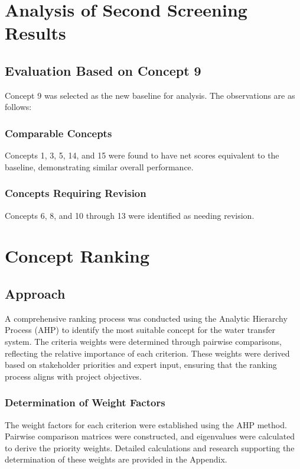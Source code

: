 \documentclass[12pt]{article}
\begin{document}
\section{Analysis of Second Screening Results}

\subsection{Evaluation Based on Concept 9}  

Concept 9 was selected as the new baseline for analysis. The observations are as follows: 

\subsubsection{Comparable Concepts}  
Concepts 1, 3, 5, 14, and 15 were found to have net scores equivalent to the baseline, demonstrating similar overall performance.  

\subsubsection{Concepts Requiring Revision}  
Concepts 6, 8, and 10 through 13 were identified as needing revision.

\section{Concept Ranking}

\subsection{Approach}

A comprehensive ranking process was conducted using the Analytic Hierarchy Process (AHP) to identify the most suitable concept for the water transfer system. The criteria weights were determined through pairwise comparisons, reflecting the relative importance of each criterion. These weights were derived based on stakeholder priorities and expert input, ensuring that the ranking process aligns with project objectives.

\subsubsection{Determination of Weight Factors}

The weight factors for each criterion were established using the AHP method. Pairwise comparison matrices were constructed, and eigenvalues were calculated to derive the priority weights. Detailed calculations and research supporting the determination of these weights are provided in the Appendix.
\end{document}
